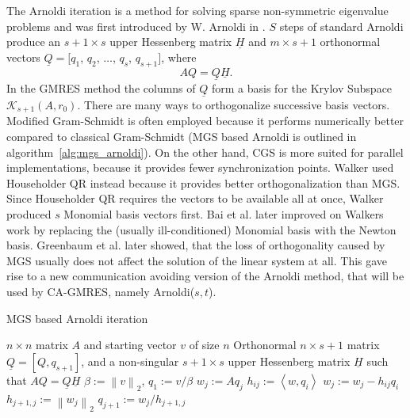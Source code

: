 \documentclass{scrartcl}
\numberwithin{equation}{section}
\newcommand{\norm}[1]{\left\lVert#1\right\rVert}
\begin{document}
The Arnoldi iteration is a method for solving sparse non-symmetric eigenvalue problems and was first introduced by W. Arnoldi in \cite{arnoldi:hal-01712943}. $S$ steps of standard Arnoldi produce an $s + 1 \times s$ upper Hessenberg matrix $\underline{H}$ and $m \times s + 1$ orthonormal vectors $\underline{Q} = [q_1$, $q_2$, $\ldots$, $q_s$, $q_{s + 1}]$, where 
\begin{equation} \label{eq:AQ=QH}
	AQ = \underline{Q} \underline{H}.
\end{equation}
In the GMRES method the columns of $\underline{Q}$ form a basis for the Krylov Subspace $\mathcal{K}_{s + 1}(A, r_0)$. There are many ways to orthogonalize successive basis vectors. Modified Gram-Schmidt is often employed because it performs numerically better compared to classical Gram-Schmidt (MGS based Arnoldi is outlined in algorithm~\ref{alg:mgs_arnoldi}). On the other hand, CGS is more suited for parallel implementations, because it provides fewer synchronization points.
Walker \cite{doi:10.1137/Walker} used Householder QR instead because it provides better orthogonalization than MGS. Since Householder QR requires the vectors to be available all at once, Walker produced $s$ Monomial basis vectors first. Bai et al. \cite{doi:10.1093/imanum/NewtonGMRES_bai} later improved on Walkers work by replacing the (usually ill-conditioned) Monomial basis with the Newton basis. Greenbaum et al. \cite{Greenbaum97numericalbehaviour} later showed, that the loss of orthogonality caused by MGS usually does not affect the solution of the linear system at all. This gave rise to a new communication avoiding version of the Arnoldi method, that will be used by CA-GMRES, namely Arnoldi($s,t$).

\begin{algorithm}[H]
\caption{MGS based Arnoldi iteration}
\label{alg:mgs_arnoldi}
\begin{algorithmic}[1]
    \REQUIRE $n \times n$ matrix $A$ and  starting vector $v$ of size $n$
	\ENSURE Orthonormal $n \times s + 1$ matrix $\underline{Q} = [Q,q_{s + 1}]$, and a non-singular $s + 1 \times s$ upper Hessenberg matrix $\underline{H}$ such that $AQ = \underline{Q} \underline{H}$
    \STATE $\beta := \norm{v}_2$, $q_1 := v/\beta$ 
		\STATE $w_j := Aq_j$
			\STATE $h_{ij} :=  \left< w, q_i \right>$
			\STATE $w_j := w_j - h_{ij}q_i$
		\ENDFOR
		\STATE $h_{j + 1, j} := \norm{w_j}_2$
		\STATE $q_{j + 1} := w_j / h_{j + 1, j}$
	\ENDFOR
\end{algorithmic}
\end{algorithm}
\end{document}
